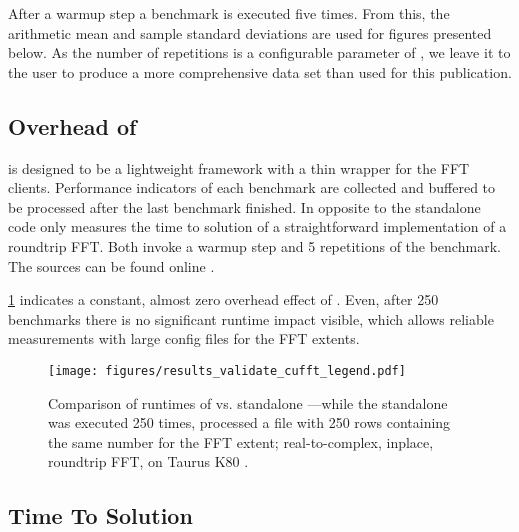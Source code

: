 After a warmup step a benchmark is executed five times. From this, the arithmetic mean and sample standard deviations are used for figures presented below. As the number of repetitions is a configurable parameter of \gearshifft{}, we leave it to the user to produce a more comprehensive data set than used for this publication. %


\subsection{Overhead of \gearshifft{}}
\gearshifft{} is designed to be a lightweight framework with a thin wrapper for the FFT clients. Performance indicators of each benchmark are collected and buffered to be processed  after the last benchmark finished. In opposite to \gearshifft{} the \cufft{} standalone code only measures the time to solution of a straightforward implementation of a roundtrip FFT.
Both invoke a warmup step and 5 repetitions of the benchmark.
The sources can be found online \cite{gearshifft_github}.

\cref{fig:verify_cufft} indicates a constant, almost zero overhead effect of \gearshifft{}.
Even, after 250 benchmarks there is no significant runtime impact visible, which allows reliable measurements with large config files for the FFT extents.

\begin{figure}[!htbp]
\vspace{-1em}
  \centering
  \texttt{[image: figures/results\_validate\_cufft\_legend.pdf]}\vspace{-1em}
  \hfill
  \caption{Comparison of runtimes of \gearshifft{} vs. standalone \cufft{}---while the standalone \cufft{} was executed 250 times, \gearshifft{} processed a file with 250 rows containing the same number for the FFT extent; real-to-complex, inplace, roundtrip FFT, on Taurus K80 \cite{taurus}.}
  \label{fig:verify_cufft}
\end{figure}

\subsection{Time To Solution}
\label{ssec:tts}

